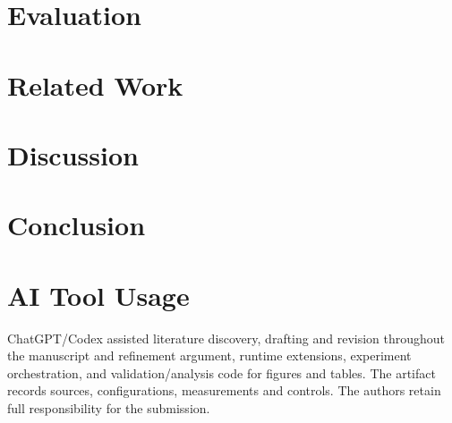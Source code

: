 \documentclass[conference,10pt]{IEEEtran}
\begin{document}
\section{Evaluation}\label{sec:eval}





\section{Related Work}\label{sec:related}

\section{Discussion}\label{sec:discussion}

\section{Conclusion}\label{sec:conclusion}

\section*{AI Tool Usage}
ChatGPT/Codex assisted literature discovery, drafting and revision
throughout the manuscript and refinement argument, runtime extensions,
experiment orchestration, and validation/analysis code for figures and
tables. The artifact records sources, configurations, measurements and
controls. The authors retain full responsibility for the submission.
\clearpage


\end{document}
